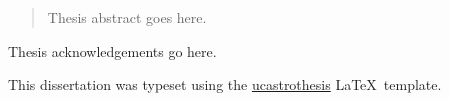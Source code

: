 \documentclass[12pt]{myucthesis}
\begin{document}
\ssp %
\hypersetup{pageanchor=false}

\maketitle
\copyrightpage

\begin{abstract}
Thesis abstract goes here.
\end{abstract}

\hypersetup{pageanchor=true}
\begin{frontmatter}


\tableofcontents
\listoffigures %
\listoftables %


\begin{acknowledgements}
Thesis acknowledgements go here.

This dissertation was typeset using the
\href{https://github.com/pkgw/ucastrothesis}{\textsf{ucastrothesis}}
\LaTeX\ template.

\end{acknowledgements}
\end{frontmatter}





%
%

{}
\end{document}

